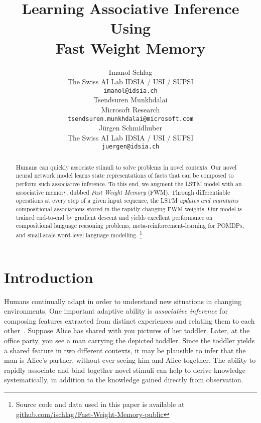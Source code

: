 \documentclass{article} \usepackage{iclr2021_conference,times}
\title{Learning Associative Inference Using \\ Fast Weight Memory}
\author{Imanol Schlag \\
The Swiss AI Lab IDSIA / USI / SUPSI\\
\texttt{imanol@idsia.ch} \\
\And
Tsendsuren Munkhdalai \\
Microsoft Research \\
\texttt{tsendsuren.munkhdalai@microsoft.com} \\
\And
J\"urgen Schmidhuber \\
The Swiss AI Lab IDSIA / USI / SUPSI\\
\texttt{juergen@idsia.ch} \\
}
\begin{document}
\maketitle

\begin{abstract}
Humans can quickly associate stimuli to solve problems in novel contexts. Our novel neural network model learns state representations of facts that can be composed to perform such associative inference. To this end, we augment the LSTM model with an associative memory, dubbed \textit{Fast Weight Memory} (FWM). Through differentiable operations at every step of a given input sequence, the LSTM \textit{updates and maintains} compositional associations stored in the rapidly changing FWM weights. Our model is trained end-to-end by gradient descent and yields excellent performance on compositional language reasoning problems, meta-reinforcement-learning for POMDPs, and small-scale word-level language modelling. \footnote{Source code and data used in this paper is available at \href{https://github.com/ischlag/Fast-Weight-Memory-public}{github.com/ischlag/Fast-Weight-Memory-public}}
\end{abstract}

\section{Introduction}
Humans continually adapt in order to understand new situations in changing environments. 
One important adaptive ability is \textit{associative inference} for
composing features extracted from distinct experiences and relating them to each other~\citep{schlichting2015memory, gershman2015discovering}. 
Suppose Alice has shared with you pictures of her toddler.
Later, at the office party, you see a man carrying the depicted toddler.
Since the toddler yields a shared feature in two different contexts, it may be plausible to infer that the man is Alice's partner, without ever seeing him and Alice together. 
The ability to rapidly associate and bind together novel stimuli can help to derive knowledge systematically, in addition to the knowledge gained directly from observation. 
\end{document}

